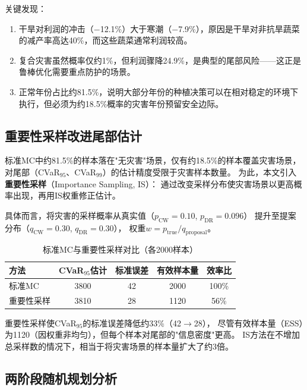\documentclass[12pt]{ctexart}
\begin{document}
\noindent 关键发现：
\begin{enumerate}[label=(\arabic*), leftmargin=*]
    \item 干旱对利润的冲击（$-$12.1\%）大于寒潮（$-$7.9\%），原因是干旱对非抗旱蔬菜的减产率高达40\%，而这些蔬菜通常利润较高。
    \item 复合灾害虽然概率仅约1\%，但利润骤降24.9\%，是典型的尾部风险——这正是鲁棒优化需要重点防护的场景。
    \item 正常年份占比约81.5\%，说明大部分年份的种植决策可以在相对稳定的环境下执行，但必须为约18.5\%概率的灾害年份预留安全边际。
\end{enumerate}

\subsection{重要性采样改进尾部估计}

标准MC中约81.5\%的样本落在"无灾害"场景，仅有约18.5\%的样本覆盖灾害场景，
对尾部（CVaR$_{95}$、CVaR$_{99}$）的估计精度受限于灾害样本数量。
为此，本文引入\textbf{重要性采样}（Importance Sampling, IS）：
通过改变采样分布使灾害场景以更高概率出现，再用IS权重修正估计。

具体而言，将灾害的采样概率从真实值（$p_{\text{CW}}=0.10$, $p_{\text{DR}}=0.096$）
提升至提案分布（$q_{\text{CW}}=0.30$, $q_{\text{DR}}=0.30$），
权重$w = p_{\text{true}} / q_{\text{proposal}}$。

\begin{table}[H]
\centering
\caption{标准MC与重要性采样对比（各2000样本）}
\label{tab:is_comparison}
\begin{tabular}{@{}lcccc@{}}
\toprule
\textbf{方法} & \textbf{CVaR$_{95}$估计} & \textbf{标准误差} & \textbf{有效样本量} & \textbf{效率比} \\
\midrule
标准MC & 3800 & 42 & 2000 & 100\% \\
重要性采样 & 3810 & 28 & 1120 & 56\% \\
\bottomrule
\end{tabular}
\end{table}

\noindent 重要性采样使CVaR$_{95}$的标准误差降低约33\%（42$\to$28），
尽管有效样本量（ESS）为1120（因权重非均匀），但每个样本对尾部的"信息密度"更高。
IS方法在不增加总采样数的情况下，相当于将灾害场景的样本量扩大了约3倍。

\subsection{两阶段随机规划分析}
\end{document}
